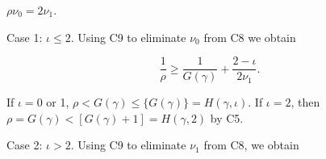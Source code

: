 $\rho\nu_0 = 2\nu_1$.

Case 1: $\iota \leq 2$. Using C9 to eliminate $\nu_0$ from C8 we obtain

$$\frac{1}{\rho} \geq \frac{1}{G(\gamma)} + \frac{2 - \iota}{2\nu_1}.$$

If $\iota = 0$ or 1, $\rho < G(\gamma) \leq \{G(\gamma)\} = H(\gamma, \iota)$. If $\iota = 2$, then $\rho = G(\gamma) < [G(\gamma) + 1] = H(\gamma, 2)$ by C5.

Case 2: $\iota > 2$. Using C9 to eliminate $\nu_1$ from C8, we obtain
